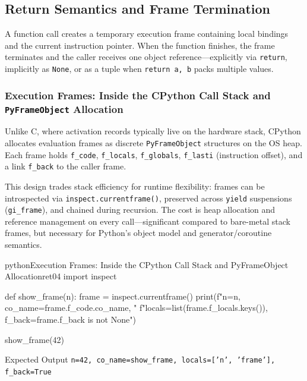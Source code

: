 \subsection{Return Semantics and Frame Termination}

A function call creates a temporary execution frame containing local bindings and the current instruction pointer. When the function finishes, the frame terminates and the caller receives one object reference---explicitly via \texttt{return}, implicitly as \texttt{None}, or as a tuple when \texttt{return a, b} packs multiple values.

\subsubsection{Execution Frames: Inside the CPython Call Stack and \texttt{PyFrameObject} Allocation}

Unlike C, where activation records typically live on the hardware stack, CPython allocates evaluation frames as discrete \texttt{PyFrameObject} structures on the OS heap. Each frame holds \texttt{f\_code}, \texttt{f\_locals}, \texttt{f\_globals}, \texttt{f\_lasti} (instruction offset), and a link \texttt{f\_back} to the caller frame.

This design trades stack efficiency for runtime flexibility: frames can be introspected via \texttt{inspect.currentframe()}, preserved across \texttt{yield} suspensions (\texttt{gi\_frame}), and chained during recursion. The cost is heap allocation and reference management on every call---significant compared to bare-metal stack frames, but necessary for Python's object model and generator/coroutine semantics.

\begin{codebox}[]{python}{Execution Frames: Inside the CPython Call Stack and PyFrameObject Allocation}{ret04}
import inspect

def show_frame(n):
    frame = inspect.currentframe()
    print(f"n={n}, co_name={frame.f_code.co_name}, "
          f"locals={list(frame.f_locals.keys())}, f_back={frame.f_back is not None}")

show_frame(42)
\end{codebox}


\begin{iobox}{Expected Output}
\texttt{n=42, co\_name=show\_frame, locals=['n', 'frame'], f\_back=True} \\
\end{iobox}




